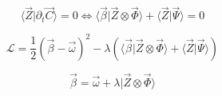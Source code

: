 \documentclass[aps,12pt]{revtex4}
\begin{document}
\begin{equation}
	\langle \vec Z \vert \partial_t \vec C \rangle = 0 \iff \langle \vec \beta \vert \vec Z \otimes \vec \Phi \rangle + \langle \vec Z \vert \vec \Psi \rangle = 0
\end{equation}
  
 \begin{equation}
	\mathcal L = \dfrac{1}{2} \left( \vec \beta - \vec\omega\right)^2 
	- \lambda \left(\langle \vec \beta \vert \vec Z \otimes \vec \Phi \rangle + \langle \vec Z \vert \vec \Psi \rangle \right)
\end{equation} 

\begin{equation}
	\vec \beta = \vec \omega + \lambda \vert \vec Z \otimes \vec \Phi \rangle 
\end{equation}  
  
\end{document}
